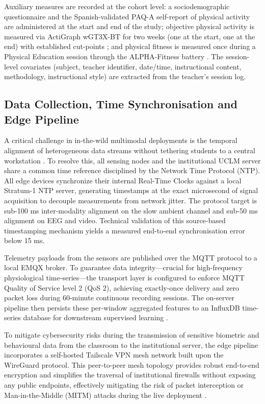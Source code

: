 Auxiliary measures are recorded at the cohort level: a sociodemographic questionnaire and the Spanish-validated PAQ-A self-report of physical activity \parencite{MartinezGomez2009_paq_a} are administered at the start and end of the study; objective physical activity is measured via ActiGraph wGT3X-BT for two weeks (one at the start, one at the end) with established cut-points \parencite{Evenson2008_actigraph}; and physical fitness is measured once during a Physical Education session through the ALPHA-Fitness battery \parencite{RuizFernandez2011_alpha}. The session-level covariates (subject, teacher identifier, date/time, instructional content, methodology, instructional style) are extracted from the teacher's session log.

\subsection{Data Collection, Time Synchronisation and Edge Pipeline}\label{subsec:pipeline}

A critical challenge in in-the-wild multimodal deployments is the temporal alignment of heterogeneous data streams without tethering students to a central workstation \parencite{martinez-maldonado_lessons_2024}. To resolve this, all sensing nodes and the institutional UCLM server share a common time reference disciplined by the Network Time Protocol (NTP). All edge devices synchronize their internal Real-Time Clocks against a local Stratum-1 NTP server, generating timestamps at the exact microsecond of signal acquisition to decouple measurements from network jitter. The protocol target is sub-100 ms inter-modality alignment on the slow ambient channel and sub-50 ms alignment on EEG and video. Technical validation of this source-based timestamping mechanism yields a measured end-to-end synchronisation error below 15 ms.

Telemetry payloads from the sensors are published over the MQTT protocol to a local EMQX broker. To guarantee data integrity—crucial for high-frequency physiological time-series—the transport layer is configured to enforce MQTT Quality of Service level 2 (QoS 2), achieving exactly-once delivery and zero packet loss during 60-minute continuous recording sessions. The on-server pipeline then persists these per-window aggregated features to an InfluxDB time-series database for downstream supervised learning \parencite{Mishra2020_mqtt, Shi2016_edge}.

To mitigate cybersecurity risks during the transmission of sensitive biometric and behavioural data from the classroom to the institutional server, the edge pipeline incorporates a self-hosted Tailscale VPN mesh network built upon the WireGuard protocol. This peer-to-peer mesh topology provides robust end-to-end encryption and simplifies the traversal of institutional firewalls without exposing any public endpoints, effectively mitigating the risk of packet interception or Man-in-the-Middle (MITM) attacks during the live deployment \parencite{alrashdi_ad-iot_2019}.

